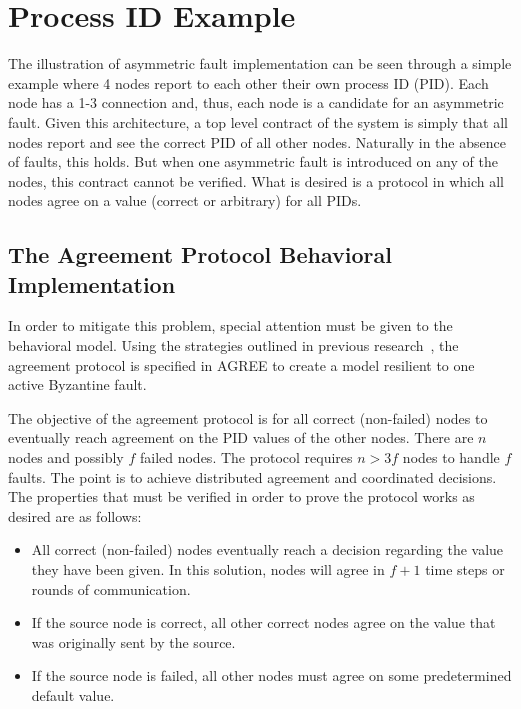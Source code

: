 \section{Process ID Example}
\label{sec:pid}
The illustration of asymmetric fault implementation can be seen through a simple example where 4 nodes report to each other their own process ID (PID). Each node has a 1-3 connection and, thus, each node is a candidate for an asymmetric fault. Given this architecture, a top level contract of the system is simply that all nodes report and see the correct PID of all other nodes. Naturally in the absence of faults, this holds. But when one asymmetric fault is introduced on any of the nodes, this contract cannot be verified. What is desired is a protocol in which all nodes agree on a value (correct or arbitrary) for all PIDs. 

\subsection{The Agreement Protocol Behavioral Implementation}
In order to mitigate this problem, special attention must be given to the behavioral model. Using the strategies outlined in previous research~\cite{bracha1987asynchronous,Driscoll-Byzantine-Fault}, the agreement protocol is specified in AGREE to create a model resilient to one active Byzantine fault. 

The objective of the agreement protocol is for all correct (non-failed) nodes to eventually reach agreement on the PID values of the other nodes. There are $n$ nodes and possibly $f$ failed nodes. The protocol requires $n > 3f$ nodes to handle $f$ faults. The point is to achieve distributed agreement and coordinated decisions.
The properties that must be verified in order to prove the protocol works as desired are as follows: 
\begin{itemize}
	\item All correct (non-failed) nodes eventually reach a decision regarding the value they have been given.  In this solution, nodes will agree in $f+1$ time steps or rounds of communication.   
	\item If the source node is correct, all other correct nodes agree on the value that was originally sent by the source.  
	\item If the source node is failed, all other nodes must agree on some predetermined default value.  
\end{itemize}

